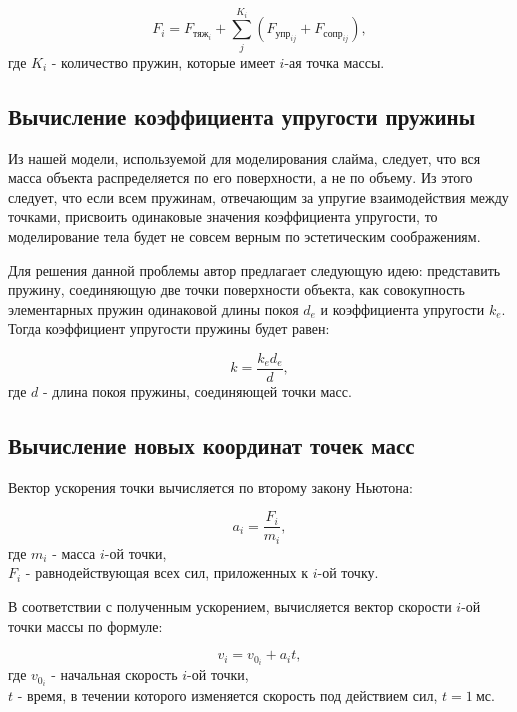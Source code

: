 \begin{equation}\label{f}
	F_i = F_{\text{тяж}_i} + \sum_{j}^{K_i} (F_{\text{упр}_{ij}} + F_{\text{сопр}_{ij}}),
\end{equation}
где $K_i$ - количество пружин, которые имеет $i$-ая точка массы.

\subsection{Вычисление коэффициента упругости пружины}

Из нашей модели, используемой для моделирования слайма, следует, что вся масса объекта распределяется по его поверхности, а не по объему. Из этого следует, что если всем пружинам, отвечающим за упругие взаимодействия между точками, присвоить одинаковые значения коэффициента упругости, то моделирование тела будет не совсем верным по эстетическим соображениям.

Для решения данной проблемы автор предлагает следующую идею: представить пружину, соединяющую две точки поверхности объекта, как совокупность элементарных пружин одинаковой длины покоя $d_e$ и коэффициента упругости $k_e$. Тогда коэффициент упругости пружины будет равен:

\begin{equation}\label{stif}
	k = \frac{k_e d_e}{d},
\end{equation}
где $d$ - длина покоя пружины, соединяющей точки масс.

\subsection{Вычисление новых координат точек масс}

Вектор ускорения точки вычисляется по второму закону Ньютона:

\begin{equation}\label{sln}
	a_i = \frac{F_i}{m_i},
\end{equation}
где $m_i$ - масса $i$-ой точки,\\
\text{~~~~~~}$F_i$ - равнодействующая всех сил, приложенных к $i$-ой точку.

В соответствии с полученным ускорением, вычисляется вектор скорости $i$-ой точки массы по формуле:

\begin{equation}\label{velocity}
	v_i = v_{0_i} + a_i t,
\end{equation}
где $v_{0_i}$ - начальная скорость $i$-ой точки,\\
\text{~~~~~~}$t$ - время, в течении которого изменяется скорость под действием сил, $t = 1~\text{мс}$.

